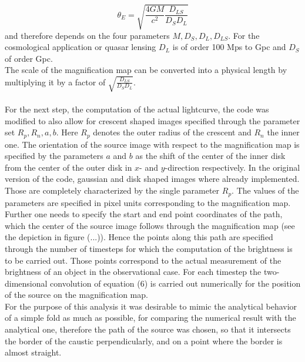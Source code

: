 \begin{equation}
\theta_{E}=\sqrt{\frac{4GM}{c^{2}} \frac{D_{LS}}{D_{S}D_{L}}} 
\end{equation}  
and therefore depends on the four parameters $M,D_{S},D_{L},D_{LS}$. For the cosmological application or quasar lensing $D_{L}$ is of order 100 Mps to Gpc and $D_{S}$ of order Gpc.\\   
The scale of the magnification map can be converted into a physical length by multiplying it by a factor of $ \sqrt{\frac{D_{LS}}{D_{S}D_{L}}}$.\\\\
For the next step, the computation of the actual lightcurve, the code was modified to also allow for crescent shaped images specified through the parameter set $R_p,R_n,a,b$. Here $R_p$ denotes the outer radius of the crescent and $R_n$ the inner one. The orientation of the source image with respect to the magnification map is specified by the parameters $a$ and $b$ as the shift of the center of the inner disk from the center of the outer disk in $x$- and $y$-direction respectively. In the original version of the code, gaussian and disk shaped images where already implemented. Those are completely characterized by the single parameter $R_p$. The values of the parameters are specified in pixel units corresponding to the magnification map. Further one needs to specify the start and end point coordinates of the path, which the center of the source image follows through the magnification map (see the depiction in figure (...)). Hence the points along this path are specified through the number of timesteps for which the computation of the brightness is to be carried out. Those points correspond to the actual measurement of the brightness of an object in the observational case. For each timestep the two-dimensional convolution of equation (6) is carried out numerically for the position of the source on the magnification map. \\
For the purpose of this analysis it was desirable to mimic the analytical behavior of a simple fold as much as possible, for comparing the numerical result with the analytical one, therefore the path of the source was chosen, so that it intersects the border of the caustic perpendicularly, and on a point where the border is almost straight.  
